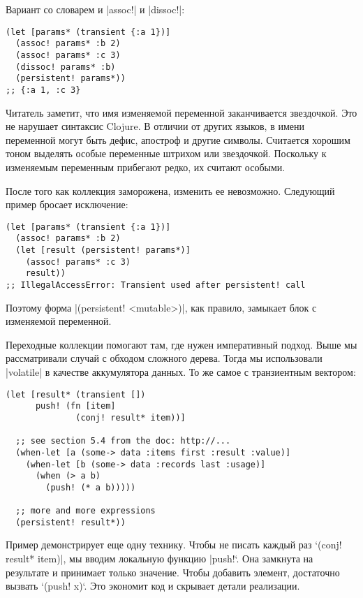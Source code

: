 Вариант со словарем и \spverb|assoc!| и \spverb|dissoc!|:

\begin{verbatim}
(let [params* (transient {:a 1})]
  (assoc! params* :b 2)
  (assoc! params* :c 3)
  (dissoc! params* :b)
  (persistent! params*))
;; {:a 1, :c 3}
\end{verbatim}

Читатель заметит, что имя изменяемой переменной заканчивается звездочкой. Это не
нарушает синтаксис Clojure. В отличии от других языков, в имени переменной могут
быть дефис, апостроф и другие символы. Считается хорошим тоном выделять особые
переменные штрихом или звездочкой. Поскольку к изменяемым переменным прибегают
редко, их считают особыми.

После того как коллекция заморожена, изменить ее невозможно. Следующий пример
бросает исключение:

\begin{verbatim}
(let [params* (transient {:a 1})]
  (assoc! params* :b 2)
  (let [result (persistent! params*)]
    (assoc! params* :c 3)
    result))
;; IllegalAccessError: Transient used after persistent! call
\end{verbatim}

Поэтому форма \spverb|(persistent! <mutable>)|, как правило, замыкает блок с изменяемой
переменной.

Переходные коллекции помогают там, где нужен императивный подход. Выше мы
рассматривали случай с обходом сложного дерева. Тогда мы использовали \spverb|volatile|
в качестве аккумулятора данных. То же самое с транзиентным вектором:

\begin{verbatim}
(let [result* (transient [])
      push! (fn [item]
              (conj! result* item))]

  ;; see section 5.4 from the doc: http://...
  (when-let [a (some-> data :items first :result :value)]
    (when-let [b (some-> data :records last :usage)]
      (when (> a b)
        (push! (* a b)))))

  ;; more and more expressions
  (persistent! result*))
\end{verbatim}

Пример демонстрирует еще одну технику. Чтобы не писать каждый раз `(conj!
result* item)\spverb|, мы вводим локальную функцию |push!`. Она замкнута на результате
и принимает только значение. Чтобы добавить элемент, достаточно вызвать `(push!
x)`. Это экономит код и скрывает детали реализации.

